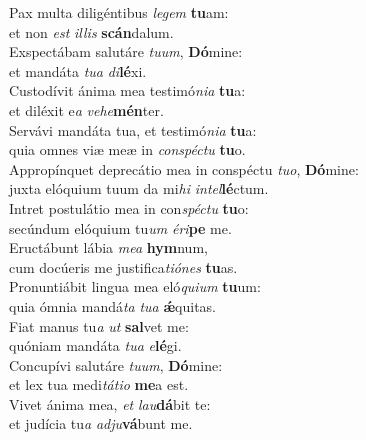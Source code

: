 \oddverse Pax multa diligéntibus \textit{le}\textit{gem} \textbf{tu}am:~\*\\
\oddverse et non \textit{est} \textit{il}\textit{lis} \textbf{scán}dalum.\\
\evenverse Exspectábam salutáre \textit{tu}\textit{um}, \textbf{Dó}mine:~\*\\
\evenverse et mandáta \textit{tu}\textit{a} \textit{di}\textbf{lé}xi.\\
\oddverse Custodívit ánima mea testimó\textit{ni}\textit{a} \textbf{tu}a:~\*\\
\oddverse et diléxit e\textit{a} \textit{ve}\textit{he}\textbf{mén}ter.\\
\evenverse Servávi mandáta tua, et testimó\textit{ni}\textit{a} \textbf{tu}a:~\*\\
\evenverse quia omnes viæ meæ in \textit{con}\textit{spé}\textit{ctu} \textbf{tu}o.\\
\oddverse Appropínquet deprecátio mea in conspéctu \textit{tu}\textit{o}, \textbf{Dó}mine:~\*\\
\oddverse juxta elóquium tuum da mi\textit{hi} \textit{in}\textit{tel}\textbf{lé}ctum.\\
\evenverse Intret postulátio mea in con\textit{spé}\textit{ctu} \textbf{tu}o:~\*\\
\evenverse secúndum elóquium tu\textit{um} \textit{é}\textit{ri}\textbf{pe} me.\\
\oddverse Eructábunt lábia \textit{me}\textit{a} \textbf{hym}num,~\*\\
\oddverse cum docúeris me justifica\textit{ti}\textit{ó}\textit{nes} \textbf{tu}as.\\
\evenverse Pronuntiábit lingua mea eló\textit{qui}\textit{um} \textbf{tu}um:~\*\\
\evenverse quia ómnia mandá\textit{ta} \textit{tu}\textit{a} \textbf{ǽ}quitas.\\
\oddverse Fiat manus tu\textit{a} \textit{ut} \textbf{sal}vet me:~\*\\
\oddverse quóniam mandáta \textit{tu}\textit{a} \textit{e}\textbf{lé}gi.\\
\evenverse Concupívi salutáre \textit{tu}\textit{um}, \textbf{Dó}mine:~\*\\
\evenverse et lex tua medi\textit{tá}\textit{ti}\textit{o} \textbf{me}a est.\\
\oddverse Vivet ánima mea, \textit{et} \textit{lau}\textbf{dá}bit te:~\*\\
\oddverse et judícia tu\textit{a} \textit{ad}\textit{ju}\textbf{vá}bunt me.\\
